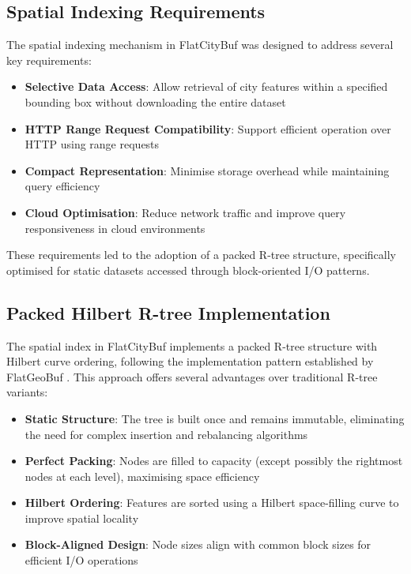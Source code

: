 \subsection{Spatial Indexing Requirements}
\label{methodology:spatial_index:requirements}

The spatial indexing mechanism in FlatCityBuf was designed to address several key requirements:

\begin{itemize}
    \item \textbf{Selective Data Access}: Allow retrieval of city features within a specified bounding box without downloading the entire dataset
    \item \textbf{HTTP Range Request Compatibility}: Support efficient operation over HTTP using range requests
    \item \textbf{Compact Representation}: Minimise storage overhead while maintaining query efficiency
    \item \textbf{Cloud Optimisation}: Reduce network traffic and improve query responsiveness in cloud environments
\end{itemize}

These requirements led to the adoption of a packed R-tree structure, specifically optimised for static datasets accessed through block-oriented I/O patterns.

\subsection{Packed Hilbert R-tree Implementation}
\label{methodology:spatial_index:packed_rtree_implementation}

The spatial index in FlatCityBuf implements a packed R-tree structure with Hilbert curve ordering, following the implementation pattern established by FlatGeoBuf \citep{williams2022implementers}. This approach offers several advantages over traditional R-tree variants:

\begin{itemize}
    \item \textbf{Static Structure}: The tree is built once and remains immutable, eliminating the need for complex insertion and rebalancing algorithms
    \item \textbf{Perfect Packing}: Nodes are filled to capacity (except possibly the rightmost nodes at each level), maximising space efficiency
    \item \textbf{Hilbert Ordering}: Features are sorted using a Hilbert space-filling curve to improve spatial locality \citep{Kamel_Faloutsos_1993}
    \item \textbf{Block-Aligned Design}: Node sizes align with common block sizes for efficient I/O operations
\end{itemize}

